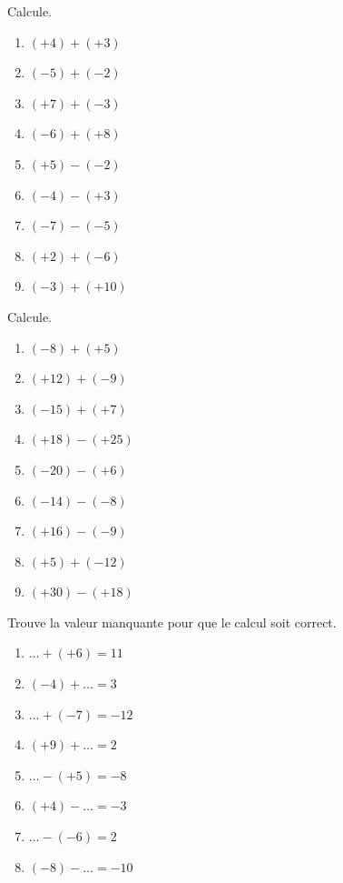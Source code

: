 \documentclass[../../syllabus_1.tex]{subfiles}
\begin{document}
\begin{exercise}
    Calcule.
    \begin{enumerate}[cols=3]
        \item \((+4) + (+3) \)
        \item \((-5) + (-2) \)
        \item \((+7) + (-3) \)
        \item \((-6) + (+8) \)
        \item \((+5) - (-2) \)
        \item \((-4) - (+3) \)
        \item \((-7) - (-5) \)
        \item \((+2) + (-6) \)
        \item \((-3) + (+10) \)
    \end{enumerate}
\end{exercise}

\begin{exercise}
    Calcule.
    \begin{enumerate}[cols=3]
        \item \((-8) + (+5) \)
        \item \((+12) + (-9) \)
        \item \((-15) + (+7) \)
        \item \((+18) - (+25) \)
        \item \((-20) - (+6) \)
        \item \((-14) - (-8) \)
        \item \((+16) - (-9) \)
        \item \((+5) + (-12) \)
        \item \((+30) - (+18) \)
    \end{enumerate}
\end{exercise}

\begin{exercise}
    Trouve la valeur manquante pour que le calcul soit correct.
    \begin{enumerate}[cols=2]
        \item \(\dots + (+6) = 11 \)
        \item \((-4) + \dots = 3 \)
        \item \(\dots + (-7) = -12 \)
        \item \((+9) + \dots = 2 \)
        \item \(\dots - (+5) = -8 \)
        \item \((+4) - \dots = -3 \)
        \item \(\dots - (-6) = 2 \)
        \item \((-8) - \dots = -10 \)
    \end{enumerate}
\end{exercise}
\end{document}
